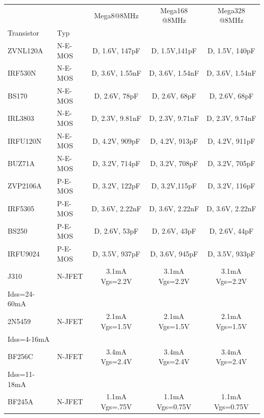 \begin{table}[H]
  \begin{center}
    \begin{tabular}{| l | l | c | c | c |}
    \hline
    \hline
             &         & Mega8@8MHz       & Mega168 @8MHz    & Mega328 @8MHz \\
 Transistor  & Typ     &                  &                  &               \\
    \hline
    \hline
ZVNL120A     & N-E-MOS & D, 1.6V, 147pF   & D, 1.5V,141pF    & D, 1.5V, 140pF \\
    \hline
IRF530N      & N-E-MOS & D, 3.6V, 1.55nF  & D, 3.6V, 1.54nF  & D, 3.6V, 1.54nF \\
    \hline
BS170        & N-E-MOS & D, 2.6V, 78pF    & D, 2.6V, 68pF    & D, 2.6V, 68pF \\
    \hline
IRL3803      & N-E-MOS & D, 2.3V, 9.81nF  & D, 2.3V, 9.71nF  & D, 2.3V, 9.74nF \\
    \hline
IRFU120N     & N-E-MOS & D, 4.2V, 909pF   & D, 4.2V, 913pF   & D, 4.2V, 911pF \\
    \hline
BUZ71A       & N-E-MOS & D, 3.2V, 714pF   & D, 3.2V, 708pF   & D, 3.2V, 705pF \\
    \hline
ZVP2106A     & P-E-MOS & D, 3.2V, 122pF   & D, 3.2V,115pF    & D, 3.2V, 116pF \\
    \hline
IRF5305      & P-E-MOS & D, 3.6V, 2.22nF  & D, 3.6V, 2.22nF  & D, 3.6V, 2.22nF \\
    \hline
BS250        & P-E-MOS & D, 2.6V, 53pF    & D, 2.6V, 43pF    & D, 2.6V, 44pF \\
    \hline
IRFU9024     & P-E-MOS & D, 3.5V, 937pF   & D, 3.6V, 945pF   & D, 3.5V, 933pF \\
    \hline
J310         & N-JFET  & 3.1mA Vgs=2.2V   & 3.1mA Vgs=2.2V   & 3.1mA Vgs=2.2V \\
Idss=24-60mA &         &                  &                  &              \\
    \hline
2N5459       & N-JFET  & 2.1mA Vgs=1.5V   & 2.1mA Vgs=1.5V   & 2.1mA Vgs=1.5V \\
Idss=4-16mA &          &                  &                  &              \\
    \hline
BF256C       & N-JFET  & 3.4mA Vgs=2.4V   & 3.4mA Vgs=2.4V   & 3.4mA Vgs=2.4V \\
Idss=11-18mA &         &                  &                  &              \\
    \hline
BF245A       & N-JFET  & 1.1mA Vgs=.75V   & 1.1mA Vgs=0.75V  & 1.1mA Vgs=0.75V \\

\end{tabular}
\end{center}
\end{table}
